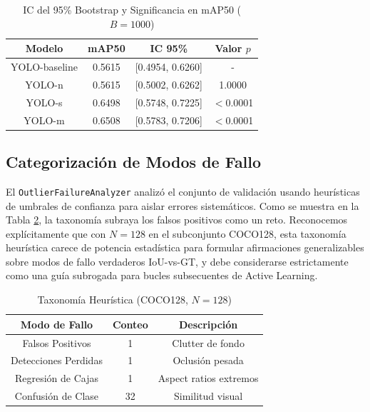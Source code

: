 \documentclass[conference]{IEEEtran}
\begin{document}
\begin{table}[htbp]
\caption{IC del 95\% Bootstrap y Significancia en mAP50 ($B=1000$)}
\begin{center}
\begin{tabular}{|c|c|c|c|}
\hline
\textbf{Modelo} & \textbf{mAP50} & \textbf{IC 95\%} & \textbf{Valor $p$} \\
\hline
YOLO-baseline & 0.5615 & [0.4954, 0.6260] & - \\
YOLO-n & 0.5615 & [0.5002, 0.6262] & 1.0000 \\
YOLO-s & 0.6498 & [0.5748, 0.7225] & $<$0.0001 \\
YOLO-m & 0.6508 & [0.5783, 0.7206] & $<$0.0001 \\
\hline
\end{tabular}
\label{tab:bootstrap}
\end{center}
\end{table}

\subsection{Categorización de Modos de Fallo}
El \texttt{OutlierFailureAnalyzer} analizó el conjunto de validación usando heurísticas de umbrales de confianza para aislar errores sistemáticos. Como se muestra en la Tabla \ref{tab:failure}, la taxonomía subraya los falsos positivos como un reto. Reconocemos explícitamente que con $N=128$ en el subconjunto COCO128, esta taxonomía heurística carece de potencia estadística para formular afirmaciones generalizables sobre modos de fallo verdaderos IoU-vs-GT, y debe considerarse estrictamente como una guía subrogada para bucles subsecuentes de Active Learning.

\begin{table}[htbp]
\caption{Taxonomía Heurística (COCO128, $N=128$)}
\begin{center}
\begin{tabular}{|c|c|c|}
\hline
\textbf{Modo de Fallo} & \textbf{Conteo} & \textbf{Descripción} \\
\hline
Falsos Positivos & 1 & Clutter de fondo \\
Detecciones Perdidas & 1 & Oclusión pesada \\
Regresión de Cajas & 1 & Aspect ratios extremos \\
Confusión de Clase & 32 & Similitud visual \\
\hline
\end{tabular}
\label{tab:failure}
\end{center}
\end{table}
\end{document}
